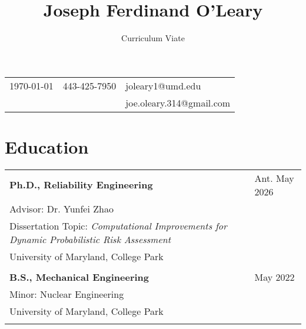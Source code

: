 \documentclass[letterpaper, 11pt]{article}
\title{\huge \textbf{Joseph Ferdinand O'Leary}}
\author{Curriculum Viate}
\date{\endgraf\rule{\textwidth}{.4pt}}
\begin{document}
\maketitle
\vspace{-1cm}
\begin{table}[H]
    \centering
    \begin{tabular}{L{0.3\textwidth} C{0.3\textwidth} R{0.3\textwidth}}
        \today & 443-425-7950 & joleary1@umd.edu \\
         & & joe.oleary.314@gmail.com \\
    \end{tabular}
\end{table}
\vspace{-0.7cm}
\section{Education}
\begin{table}[H]
    \centering
    \begin{tabular}{L{0.7\textwidth} R{0.2\textwidth}}
        \textbf{Ph.D., Reliability Engineering} & Ant. May 2026 \\
        \hspace{5pt} Advisor: Dr. Yunfei Zhao & \\
        \hspace{5pt} Dissertation Topic: \textit{ Computational Improvements for Dynamic Probabilistic Risk Assessment} &  \\
        \hspace{5pt} University of Maryland, College Park & \\
         & \\
        \textbf{B.S., Mechanical Engineering} & May 2022 \\
        \hspace{5pt} Minor: Nuclear Engineering & \\
        \hspace{5pt} University of Maryland, College Park & \\
         & \\
    \end{tabular}
\end{table}
\end{document}
